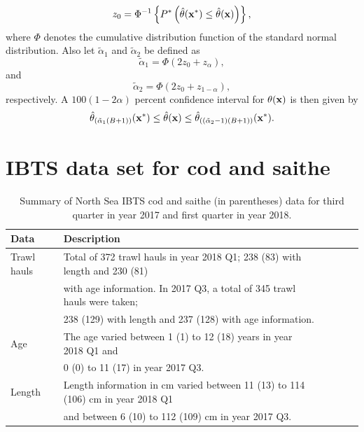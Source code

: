 \documentclass[a4paper 12pt]{article}
\numberwithin{equation}{section}
\begin{document}
{\begin{equation}
 z_{0} = \Phi^{-1} \left\{ P^{*} \left(\hat{\theta} ({\bf x^{*}}) \leq \hat{\theta} ({\bf x}) \right) \right\}, 
\end{equation}
\noindent where $  \Phi $  denotes the cumulative distribution function of the standard normal distribution. Also let $\tilde{\alpha}_{1} $ and $\tilde{\alpha}_{2} $ be defined as
\begin{equation}
\tilde{\alpha}_{1} = \Phi(2z_{0} + z_{\alpha}), 
\end{equation}
\noindent and 
\begin{equation}
\tilde{\alpha}_{2} = \Phi(2z_{0} + z_{1-\alpha}), 
\end{equation}
\noindent respectively.  A $100(1-2 \alpha)$ percent confidence interval for $ \theta ({\bf x})$ is then given by
\begin{equation}
\hat{\theta}_{\left(\tilde{\alpha}_{1}(B +1) \right)} ({\bf {x}^{*}})  \leq \hat{\theta} ({\bf x}) \leq \hat{\theta}_{\left((\tilde{\alpha}_{2} -1)(B +1) \right)} ({\bf {x}^{*}}). 
\end{equation}

\section{\large IBTS data set for cod and saithe}
\label{secAp:data}
\begin{small}
\begin{table}[h!]
\caption{Summary of North Sea IBTS cod and saithe (in parentheses) data for third quarter in year 2017 and first quarter in year 2018.}
\begin{tabular}{llllll}
\toprule
\bf Data&\bf Description \\
\midrule
Trawl hauls  & Total of 372 trawl hauls in year 2018 Q1; 238 (83)  with length and 230 (81) \\ & with age information. In 2017 Q3, a total of 345  trawl hauls were taken; \\ & 238 (129) with length and 237 (128) with age information. \\[1.7ex]

Age &The age varied between 1 (1) to 12 (18) years in year 2018 Q1 and \\ & 0 (0) to 11 (17) in year 2017 Q3. \\[1.7ex]

Length & Length information in cm varied between 11 (13) to 114 (106) cm in year 2018 Q1 \\ & and between 6 (10) to 112 (109) cm in year 2017 Q3. \\[1.7ex]


\end{tabular}
\end{table}
\end{small}}
\end{document}
